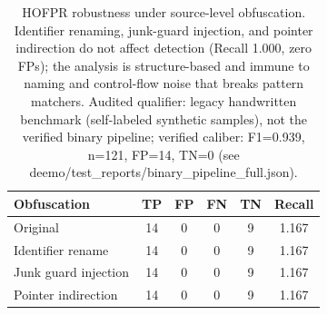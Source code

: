 \begin{table}[t]
\centering
\small
\begin{tabular}{lccccc}
\toprule
Obfuscation & TP & FP & FN & TN & Recall \\
\midrule
  Original & 14 & 0 & 0 & 9 & 1.167 \\
  Identifier rename & 14 & 0 & 0 & 9 & 1.167 \\
  Junk guard injection & 14 & 0 & 0 & 9 & 1.167 \\
  Pointer indirection & 14 & 0 & 0 & 9 & 1.167 \\
\bottomrule
\end{tabular}
\caption{HOFPR robustness under source-level obfuscation. Identifier
renaming, junk-guard injection, and pointer indirection do not affect
detection (Recall 1.000, zero FPs); the analysis is structure-based
and immune to naming and control-flow noise that breaks pattern
matchers. Audited qualifier: legacy handwritten benchmark (self-labeled synthetic samples), not the verified binary pipeline; verified caliber: F1=0.939, n=121, FP=14, TN=0 (see deemo/test_reports/binary_pipeline_full.json).}
\label{tab:robustness}
\end{table}
